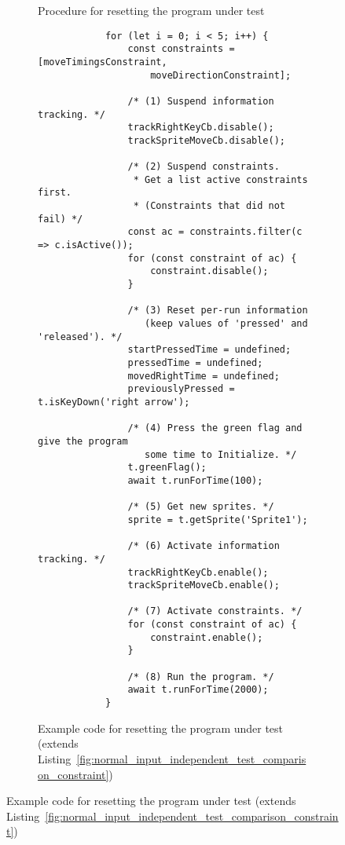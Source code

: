 \begin{figure}[htpb]
\begin{subfigure}[m]{.3\textwidth}
\begin{tikzpicture}[scale=0.9, every node/.style={scale=0.9}]
        \end{tikzpicture}
        \caption{Procedure for resetting the program under test}
        \label{fig:resetting_the_program_under_test_procedure}
    \end{subfigure}%
    \hspace{.13\textwidth}%
    \begin{subfigure}[m]{.55\textwidth}
        \centering
        \begin{verbatim}
            for (let i = 0; i < 5; i++) {
                const constraints = [moveTimingsConstraint,
                    moveDirectionConstraint];

                /* (1) Suspend information tracking. */
                trackRightKeyCb.disable();
                trackSpriteMoveCb.disable();

                /* (2) Suspend constraints.
                 * Get a list active constraints first.
                 * (Constraints that did not fail) */
                const ac = constraints.filter(c => c.isActive());
                for (const constraint of ac) {
                    constraint.disable();
                }

                /* (3) Reset per-run information
                   (keep values of 'pressed' and 'released'). */
                startPressedTime = undefined;
                pressedTime = undefined;
                movedRightTime = undefined;
                previouslyPressed = t.isKeyDown('right arrow');

                /* (4) Press the green flag and give the program
                   some time to Initialize. */
                t.greenFlag();
                await t.runForTime(100);

                /* (5) Get new sprites. */
                sprite = t.getSprite('Sprite1');

                /* (6) Activate information tracking. */
                trackRightKeyCb.enable();
                trackSpriteMoveCb.enable();

                /* (7) Activate constraints. */
                for (const constraint of ac) {
                    constraint.enable();
                }

                /* (8) Run the program. */
                await t.runForTime(2000);
            }
        \end{verbatim}
        \vspace{-\bigskipamount}
        \caption{Example code for resetting the program under test (extends Listing~\ref{fig:normal_input_independent_test_comparison_constraint})}
        \label{fig:resetting_the_program_under_test_example}
    \end{subfigure}


\end{figure}
